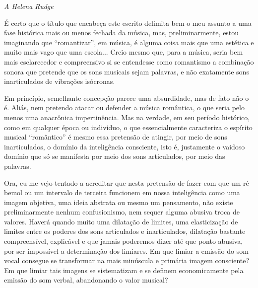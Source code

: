 

\begin{flushright}
\emph{A Helena Rudge}
\end{flushright}

É certo que o título que encabeça este escrito delimita bem o meu
assunto a uma fase histórica mais ou menos fechada da música, mas,
preliminarmente, estou imaginando que ``romantizar'', em música, é
alguma coisa mais que uma estética e muito mais vago que uma escola...
Creio mesmo que, para a música, seria bem mais esclarecedor e
compreensivo si se entendesse como romantismo a combinação sonora que
pretende que os sons musicais sejam palavras, e não exatamente sons
inarticulados de vibrações isócronas.

Em princípio, semelhante concepção parece uma absurdidade, mas de fato
não o é. Aliás, nem pretendo atacar ou defender a música romântica, o
que seria pelo menos uma anacrônica impertinência. Mas na verdade, em
seu período histórico, como em qualquer época ou indivíduo, o que
essencialmente caracteriza o espírito musical ``romântico'' é mesmo essa
pretensão de atingir, por meio de sons inarticulados, o domínio da
inteligência consciente, isto é, justamente o vaidoso domínio que só se
manifesta por meio dos sons articulados, por meio das palavras.

Ora, eu me vejo tentado a acreditar que nesta pretensão de fazer com que
um ré bemol ou um intervalo de terceira funcionem em nossa inteligência
como uma imagem objetiva, uma ideia abstrata ou mesmo um pensamento, não
existe preliminarmente nenhum confusionismo, nem sequer alguma abusiva
troca de valores. Haverá quando muito uma dilatação de limites, uma
elasticização de limites entre os poderes dos sons articulados e
inarticulados, dilatação bastante compreensível, explicável e que jamais
poderemos dizer até que ponto abusiva, por ser impossível a determinação
dos limiares. Em que limiar a emissão do som vocal consegue se
transformar na mais minúscula e primária imagem consciente? Em que
limiar tais imagens se sistematizam e se definem economicamente pela
emissão do som verbal, abandonando o valor musical?

